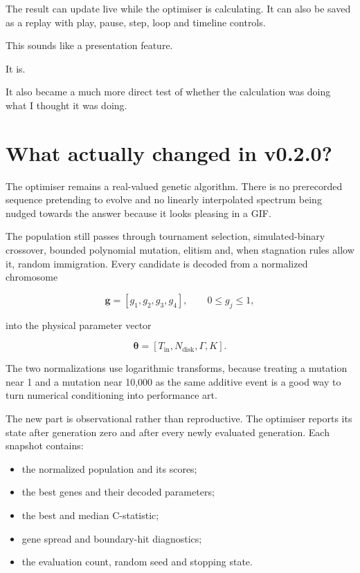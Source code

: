 \documentclass[11pt]{article}
\begin{document}
The result can update live while the optimiser is calculating. It can also be
saved as a replay with play, pause, step, loop and timeline controls.

This sounds like a presentation feature.

It is.

It also became a much more direct test of whether the calculation was doing what
I thought it was doing.

\section{What actually changed in v0.2.0?}

The optimiser remains a real-valued genetic algorithm. There is no prerecorded
sequence pretending to evolve and no linearly interpolated spectrum being
nudged towards the answer because it looks pleasing in a GIF.

The population still passes through tournament selection, simulated-binary
crossover, bounded polynomial mutation, elitism and, when stagnation rules
allow it, random immigration. Every candidate is decoded from a normalized
chromosome

\begin{equation}
  \mathbf{g} = [g_1,g_2,g_3,g_4], \qquad 0 \leq g_j \leq 1,
\end{equation}

into the physical parameter vector

\begin{equation}
  \boldsymbol{\theta} =
  [T_{\mathrm{in}},N_{\mathrm{disk}},\Gamma,K].
\end{equation}

The two normalizations use logarithmic transforms, because treating a mutation
near 1 and a mutation near 10,000 as the same additive event is a good way to
turn numerical conditioning into performance art.

The new part is observational rather than reproductive. The optimiser reports
its state after generation zero and after every newly evaluated generation.
Each snapshot contains:

\begin{itemize}
  \item the normalized population and its scores;
  \item the best genes and their decoded parameters;
  \item the best and median C-statistic;
  \item gene spread and boundary-hit diagnostics;
  \item the evaluation count, random seed and stopping state.
\end{itemize}
\end{document}
